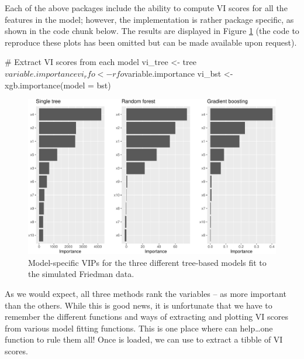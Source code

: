 Each of the above packages include the ability to compute VI scores for
all the features in the model; however, the implementation is rather
package specific, as shown in the code chunk below. The results are
displayed in Figure \ref{fig:vi-plots} (the code to reproduce these
plots has been omitted but can be made available upon request).

\begin{Schunk}
\begin{Sinput}
# Extract VI scores from each model
vi_tree <- tree$variable.importance
vi_rfo <- rfo$variable.importance
vi_bst <- xgb.importance(model = bst)
\end{Sinput}
\end{Schunk}

\begin{Schunk}
\begin{figure}[!htb]

{\centering \includegraphics[width=1\linewidth]{greenwell-boehmke_files/figure-latex/vi-plots-1} 

}

\caption[Model-specific VIPs for the three different tree-based models fit to the simulated Friedman data]{Model-specific VIPs for the three different tree-based models fit to the simulated Friedman data.}\label{fig:vi-plots}
\end{figure}
\end{Schunk}

As we would expect, all three methods rank the variables
-- as more important than the others. While this is
good news, it is unfortunate that we have to remember the different
functions and ways of extracting and plotting VI scores from various
model fitting functions. This is one place where  can
help\ldots{}one function to rule them all! Once  is loaded, we
can use  to extract a tibble of VI scores.

